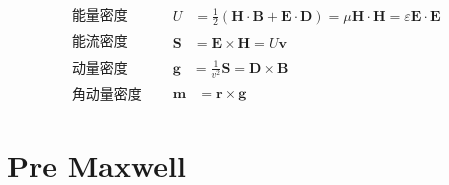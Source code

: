 \documentclass[12pt,onecolumn,a4paper]{book}
\newenvironment{block}[1]{
    \begin{tcolorbox}[colback=blue!5!white,colframe=blue!75!black,title=#1]
}{
    \end{tcolorbox}
}
\numberwithin{table}{subsection}
\numberwithin{equation}{subsection}
\begin{document}
    \begin{block}{能量}
        \begin{align}
            \text{能量密度} \quad
             &
            \begin{aligned}
                U & = \frac{1}{2} (\mathbf{H}\cdot \mathbf{B}+\mathbf{E}\cdot \mathbf{D}) = \mu \mathbf{H}\cdot \mathbf{H} = \varepsilon \mathbf{E}\cdot \mathbf{E}
            \end{aligned}
            \\
            \text{能流密度} \quad
             &
            \begin{aligned}
                \mathbf{S} & = \mathbf{E} \times \mathbf{H} = U \mathbf{v}
            \end{aligned}
            \\
            \text{动量密度} \quad
             &
            \begin{aligned}
                \mathbf{g} & = \frac{1}{v^2} \mathbf{S} = \mathbf{D} \times \mathbf{B}
            \end{aligned}
            \\
            \text{角动量密度} \quad
             &
            \begin{aligned}
                \mathbf{m} & = \mathbf{r} \times \mathbf{g}
            \end{aligned}
        \end{align}
    \end{block}


    \newpage

    \section{Pre Maxwell}
\end{document}
